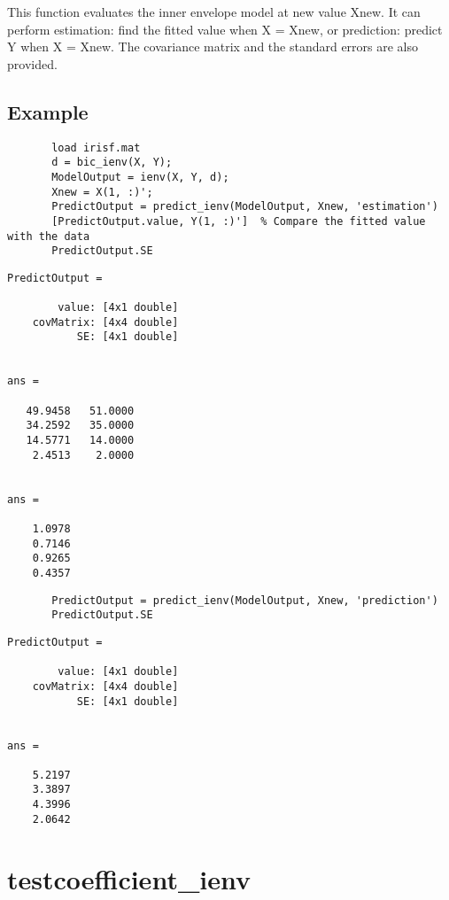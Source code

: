 \documentclass[a4paper,11pt,openany]{memoir}
\begin{document}
\begin{par}
This function evaluates the inner envelope model at new value Xnew.  It can perform estimation: find the fitted value when X = Xnew, or prediction: predict Y when X = Xnew.  The covariance matrix and the standard errors are also provided.
\end{par} \vspace{1em}


\subsection*{Example}


\begin{verbatim}       load irisf.mat
       d = bic_ienv(X, Y);
       ModelOutput = ienv(X, Y, d);
       Xnew = X(1, :)';
       PredictOutput = predict_ienv(ModelOutput, Xnew, 'estimation')
       [PredictOutput.value, Y(1, :)']  % Compare the fitted value with the data
       PredictOutput.SE\end{verbatim}
        \color{lightgray}\ttfamily \begin{verbatim}
PredictOutput = 

        value: [4x1 double]
    covMatrix: [4x4 double]
           SE: [4x1 double]


ans =

   49.9458   51.0000
   34.2592   35.0000
   14.5771   14.0000
    2.4513    2.0000


ans =

    1.0978
    0.7146
    0.9265
    0.4357
\end{verbatim} \rmfamily
\color{black}
\begin{verbatim}       PredictOutput = predict_ienv(ModelOutput, Xnew, 'prediction')
       PredictOutput.SE\end{verbatim}
    
        \color{lightgray}\ttfamily \begin{verbatim}
PredictOutput = 

        value: [4x1 double]
    covMatrix: [4x4 double]
           SE: [4x1 double]


ans =

    5.2197
    3.3897
    4.3996
    2.0642

\end{verbatim} \rmfamily
\color{black}

\newpage

\rmfamily
\color{black}\section{testcoefficient\_ienv}
\end{document}
